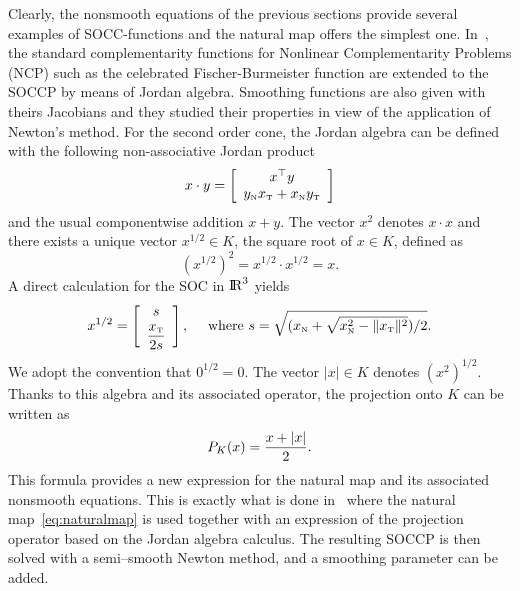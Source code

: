 {Clearly, the nonsmooth equations of the previous sections provide several examples of SOCC-functions and the natural map offers the simplest one. In~\cite{Fukushima.ea2001}, the standard complementarity functions for Nonlinear Complementarity Problems (NCP) such as the celebrated Fischer-Burmeister function are extended to the SOCCP by means of Jordan algebra. Smoothing functions are also given with theirs Jacobians and they studied their properties in view of the application of Newton's method.  For the second order cone, the Jordan algebra can be defined with the following non-associative Jordan product
\begin{equation}
  \label{eq:Jordan-product}
  x \cdot y =
  \left[\begin{array}{c}
      x^\top y \\
      y_\n x_\t + x_\n y_\t
  \end{array}
\right]
\end{equation}
and the usual componentwise addition $x+y$. The vector $x^2$ denotes $x\cdot x$ and there exists a unique vector $x^{1/2}\in K$, the square root of  $x\in K$, defined as
\begin{equation}
  \label{eq:Jordan-sqrt}
  (x^{1/2})^2 = x^{1/2} \cdot x^{1/2} = x.
\end{equation}
A direct calculation for the SOC in $\mathrm{I\!R}^3$ yields
\begin{equation}
  \label{eq:Jordan-sqrt2}
  x^{1/2} =
  \left[\begin{array}{c}
    s \\[1mm]
    \Frac {x_\t} {2s}
  \end{array}\right], \quad \text{ where } s = \sqrt{(x_\n+\sqrt{x_\n^2 - \|x_\t\|^2})/2}.
\end{equation}
We adopt the convention that $0^{1/2}=0$. The vector $|x| \in K$ denotes $(x^2)^{1/2}$. Thanks to this algebra and its associated operator, the projection onto $K$ can be written as
\begin{equation}
  \label{eq:Jordan-projection}
  P_K(x) = \Frac{x + |x|}2.
\end{equation}
This formula provides a new expression for the natural map and its associated nonsmooth equations. This is exactly what is done in~\cite{Hayashi.ea_SIOPT2005} where the natural map~\eqref{eq:naturalmap} is used together with an expression of the projection operator based on the Jordan algebra calculus. The resulting SOCCP is then solved with a semi--smooth Newton method, and a smoothing parameter can be added.

}

